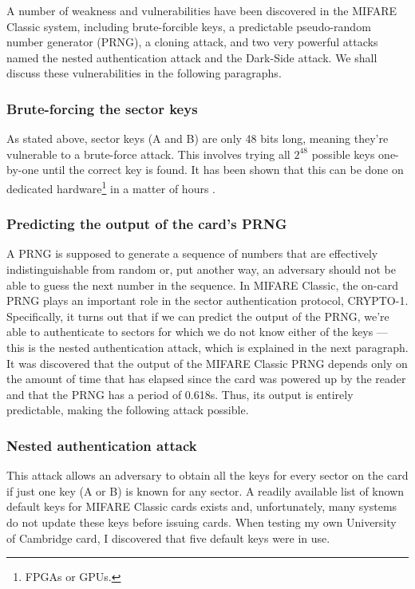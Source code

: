 \documentclass[12pt,a4paper,twoside,openright]{report}
\begin{document}
A number of weakness and vulnerabilities have been discovered in the MIFARE Classic system, including brute-forcible keys, a predictable pseudo-random number generator (PRNG), a cloning attack, and two very powerful attacks named the nested authentication attack and the Dark-Side attack. We shall discuss these vulnerabilities in the following paragraphs.

\subsubsection{Brute-forcing the sector keys}

As stated above, sector keys (A and B) are only 48 bits long, meaning they're vulnerable to a brute-force attack. This involves trying all $2^{48}$ possible keys one-by-one until the correct key is found. It has been shown that this can be done on dedicated hardware\footnote{FPGAs or GPUs.} in a matter of hours \cite{mifarebruteforce}.

\subsubsection{Predicting the output of the card's PRNG}

A PRNG is supposed to generate a sequence of numbers that are effectively indistinguishable from random or, put another way, an adversary should not be able to guess the next number in the sequence. In MIFARE Classic, the on-card PRNG plays an important role in the sector authentication protocol, CRYPTO-1. Specifically, it turns out that if we can predict the output of the PRNG, we're able to authenticate to sectors for which we do not know either of the keys --- this is the nested authentication attack, which is explained in the next paragraph. It was discovered that the output of the MIFARE Classic PRNG depends only on the amount of time that has elapsed since the card was powered up by the reader and that the PRNG has a period of 0.618s. Thus, its output is entirely predictable, making the following attack possible.

\subsubsection{Nested authentication attack}

This attack allows an adversary to obtain all the keys for every sector on the card if just one key (A or B) is known for any sector. A readily available list of known default keys for MIFARE Classic cards exists and, unfortunately, many systems do not update these keys before issuing cards. When testing my own University of Cambridge card, I discovered that five default keys were in use.
\end{document}
